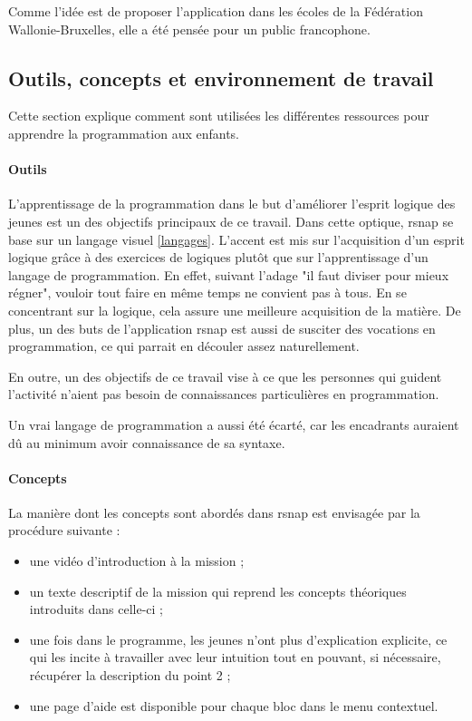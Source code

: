 Comme l'idée est de proposer l'application dans les écoles de la Fédération Wallonie-Bruxelles, elle a été pensée pour un public francophone.

\subsection{Outils, concepts et environnement de travail}
Cette section explique comment sont utilisées les différentes ressources pour apprendre la programmation aux enfants.

\paragraph{Outils}
\label{outil}
L'apprentissage de la programmation dans le but d'améliorer l'esprit logique des jeunes est un des objectifs principaux de ce travail. Dans cette optique, \gls{rsnap} se base sur un langage visuel \ref{langages}. L'accent est mis sur l'acquisition d'un esprit logique grâce à des exercices de logiques plutôt que sur l'apprentissage d'un langage de programmation.  En effet, suivant l'adage "il faut diviser pour mieux régner", vouloir tout faire en même temps ne convient pas à tous. En se concentrant sur la logique, cela assure une meilleure acquisition de la matière. De plus, un des buts de l'application \gls{rsnap} est aussi de susciter des vocations en programmation, ce qui parrait en découler assez naturellement.

En outre, un des objectifs de ce travail vise à ce que les personnes qui guident l'activité n'aient pas besoin de connaissances particulières en programmation. 

Un vrai langage de programmation a aussi été écarté, car les encadrants auraient dû au minimum avoir connaissance de sa syntaxe.

\paragraph{Concepts}
La manière dont les concepts sont abordés dans \gls{rsnap} est envisagée par la procédure suivante :
\begin{itemize}
	\item une vidéo d'introduction à la \gls{mission} ;
	\item un texte descriptif de la \gls{mission} qui reprend les concepts théoriques introduits dans celle-ci ;
	\item une fois dans le programme, les jeunes n'ont plus d'explication explicite, ce qui les incite à travailler avec leur intuition tout en pouvant, si nécessaire, récupérer la description du point 2 ;
	\item une page d'aide est disponible pour chaque \gls{bloc} dans le menu contextuel.
\end{itemize}

